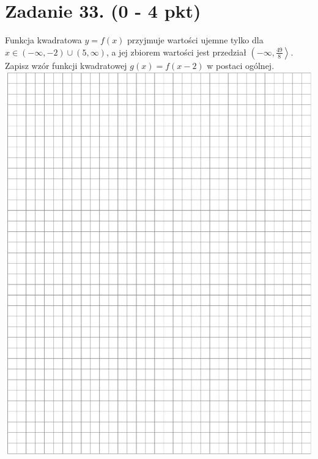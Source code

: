 \documentclass[10pt]{article}
\begin{document}
\section*{Zadanie 33. (0 - 4 pkt)}
Funkcja kwadratowa \(y=f(x)\) przyjmuje wartości ujemne tylko dla \(x \in(-\infty,-2) \cup(5, \infty)\), a jej zbiorem wartości jest przedział \(\left(-\infty, \frac{49}{8}\right\rangle\). Zapisz wzór funkcji kwadratowej \(g(x)=f(x-2)\) w postaci ogólnej.\\
\includegraphics[max width=\textwidth, center]{2024_11_21_832f1bc2b626663f1df2g-16}
\end{document}

